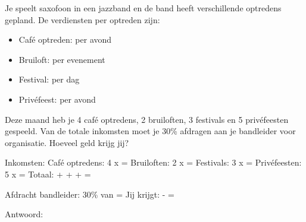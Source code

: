 \begin{opgave}
Je speelt saxofoon in een jazzband en de band heeft verschillende optredens gepland.
De verdiensten per optreden zijn:

\begin{itemize}
\item Café optreden:  per avond
\item Bruiloft:  per evenement
\item Festival:  per dag
\item Privéfeest:  per avond
\end{itemize}

Deze maand heb je 4 café optredens, 2 bruiloften, 3 festivals en 5 privéfeesten
gespeeld. Van de totale inkomsten moet je 30\% afdragen aan je bandleider voor
organisatie. Hoeveel geld krijg jij?
\end{opgave}

\begin{oplossing}
Inkomsten:
Café optredens: 4 x  = 
Bruiloften: 2 x  = 
Festivals: 3 x  = 
Privéfeesten: 5 x  = 
Totaal:  +  +  +  = 

Afdracht bandleider: 30\% van  = 
Jij krijgt:  -  = 

Antwoord: 
\end{oplossing}